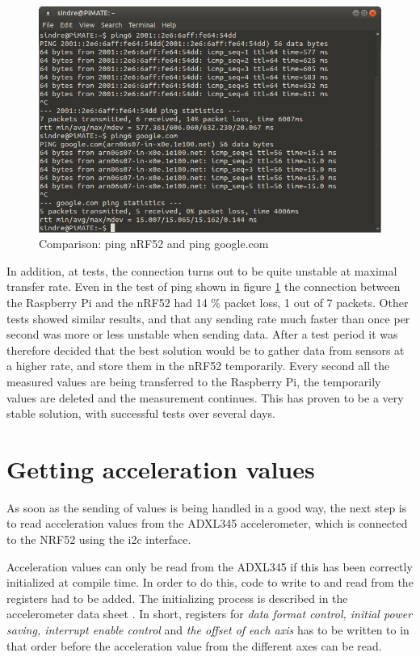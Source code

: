 \begin{figure}[h]
    \centering
    \includegraphics[scale=0.5]{ping6test.png}    
    \caption{Comparison: ping nRF52 and ping google.com}
    \label{fig:pingComparison}
\end{figure}


In addition, at tests, the connection turns out to be quite unstable at maximal transfer rate. Even in the test of ping shown in figure \ref{fig:pingComparison} the connection between the Raspberry Pi and the nRF52 had 14 \% packet loss, 1 out of 7 packets. Other tests showed similar results, and that any sending rate much faster than once per second was more or less unstable when sending data. After a test period it was therefore decided that the best solution would be to gather data from sensors at a higher rate, and store them in the nRF52 temporarily. Every second all the measured values are being transferred to the Raspberry Pi, the temporarily values are deleted and the measurement continues. This has proven to be a very stable solution, with successful tests over several days. 


\section{Getting acceleration values}

As soon as the sending of values is being handled in a good way, the next step is to read acceleration values from the ADXL345 accelerometer, which is connected to the NRF52 using the \gls{i2c} interface. 

Acceleration values can only be read from the ADXL345 if this has been correctly initialized at compile time. In order to do this, code to write to and read from the registers had to be added. The initializing process is described in the accelerometer data sheet \cite{adxlDataSheet}. In short, registers for \textit{data format control, initial power saving, interrupt enable control} and \textit{the offset of each axis} has to be written to in that order before the acceleration value from the different axes can be read.  

